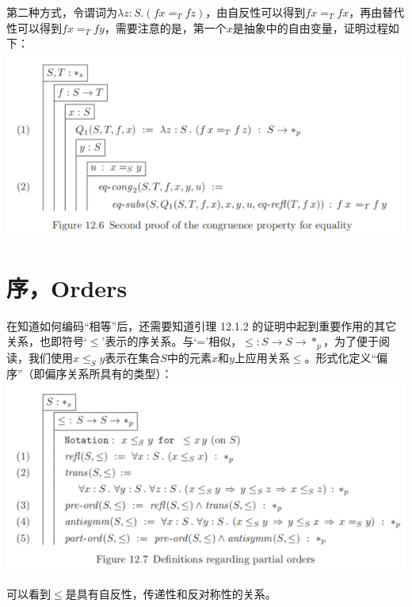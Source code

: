\documentclass[UTF8]{article}
\begin{document}
		第二种方式，令谓词为$\lambda z:S.(fx=_T fz)$，由自反性可以得到$fx=_T fx$，再由替代性可以得到$fx=_T fy$，需要注意的是，第一个$x$是抽象中的自由变量，证明过程如下：\\
		\includegraphics[width=0.93\linewidth]{"../imgs/12-6.png"}
		
	\section{序，Orders}
	\noindent
	在知道如何编码“相等”后，还需要知道引理 12.1.2 的证明中起到重要作用的其它关系，也即符号`$\le$'表示的序关系。与`='相似，$\le:S\rightarrow S\rightarrow*_p$，为了便于阅读，我们使用$x\le_S y$表示在集合$S$中的元素$x$和$y$上应用关系$\le$。形式化定义“偏序”（即偏序关系所具有的类型）：\\
	\includegraphics[width=0.93\linewidth]{"../imgs/12-7.png"}
	
		可以看到$\le$是具有自反性，传递性和反对称性的关系。
		
\end{document}
